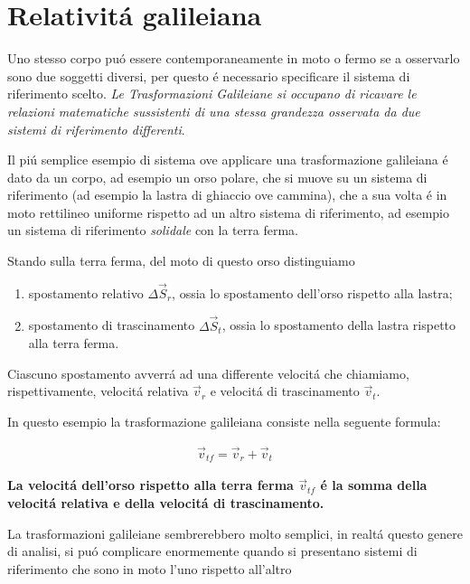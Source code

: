 \documentclass[17pt]{extarticle}
\begin{document}
\section{Relativit\'a galileiana}










Uno stesso corpo pu\'o essere contemporaneamente in moto o fermo se a osservarlo sono due soggetti diversi, per questo \'e necessario specificare il sistema di riferimento scelto. \emph{Le Trasformazioni Galileiane si occupano di ricavare le relazioni matematiche sussistenti di una stessa grandezza osservata da due sistemi di riferimento differenti}. 

Il pi\'u semplice esempio di sistema ove applicare una trasformazione galileiana \'e dato da un corpo, ad esempio un orso polare, che si muove su un sistema di riferimento (ad esempio la lastra di ghiaccio ove cammina), che a sua volta \'e in moto rettilineo uniforme rispetto ad un altro sistema di riferimento, ad esempio un sistema di riferimento \emph{solidale} con la terra ferma.

Stando sulla terra ferma, del moto di questo orso distinguiamo
\begin{enumerate}
	\item spostamento relativo $\Delta\vec{S}_r$, ossia lo spostamento dell'orso rispetto alla lastra;
	\item spostamento di trascinamento $\Delta\vec{S}_t$, ossia lo spostamento della lastra rispetto alla terra ferma.
\end{enumerate}

Ciascuno spostamento avverr\'a ad una differente velocit\'a che chiamiamo, rispettivamente, velocit\'a relativa $\vec{v}_r$ e velocit\'a di trascinamento $\vec{v}_t$.


In questo esempio la trasformazione galileiana consiste nella seguente formula:

\begin{eqnarray}\label{eq:galileo}
	\vec{v}_{tf} = \vec{v}_r + \vec{v}_t
\end{eqnarray}

{\bf La velocit\'a dell'orso rispetto alla terra ferma $\vec{v}_{tf}$ \'e la somma della velocit\'a relativa e della velocit\'a di trascinamento.}

La trasformazioni galileiane sembrerebbero molto semplici, in realt\'a questo genere di analisi, si pu\'o complicare enormemente quando si presentano sistemi di riferimento che sono in moto l'uno rispetto all'altro 
\end{document}
